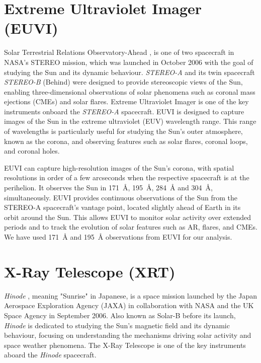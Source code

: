 \section{Extreme Ultraviolet Imager (EUVI)}

Solar Terrestrial Relations Observatory-Ahead \citep[{\it STEREO-A};][]{stereo}, is one of two spacecraft in NASA's STEREO mission, which was launched in October 2006 with the goal of studying the Sun and its dynamic behaviour. {\it STEREO-A} and its twin spacecraft {\it STEREO-B} (Behind) were designed to provide stereoscopic views of the Sun, enabling three-dimensional observations of solar phenomena such as coronal mass ejections (CMEs) and solar flares. Extreme Ultraviolet Imager \citep[EUVI;][]{euvi} is one of the key instruments onboard the {\it STEREO-A} spacecraft. EUVI is designed to capture images of the Sun in the extreme ultraviolet (EUV) wavelength range. This range of wavelengths is particularly useful for studying the Sun's outer atmosphere, known as the corona, and observing features such as solar flares, coronal loops, and coronal holes. 

EUVI can capture high-resolution images of the Sun's corona, with spatial resolutions in order of a few arcseconds when the respective spacecraft is at the perihelion. It observes the Sun in 171~{\AA}, 195~{\AA}, 284~{\AA} and 304~{\AA}, simultaneously. EUVI provides continuous observations of the Sun from the STEREO-A spacecraft's vantage point, located slightly ahead of Earth in its orbit around the Sun. This allows EUVI to monitor solar activity over extended periods and to track the evolution of solar features such as AR, flares, and CMEs. We have used 171~{\AA} and 195~{\AA} observations from EUVI for our analysis.

\section{X-Ray Telescope (XRT)}

{\it Hinode} \citep{hinode}, meaning "Sunrise" in Japanese, is a space mission launched by the Japan Aerospace Exploration Agency (JAXA) in collaboration with NASA and the UK Space Agency in September 2006. Also known as Solar-B before its launch, {\it Hinode} is dedicated to studying the Sun's magnetic field and its dynamic behaviour, focusing on understanding the mechanisms driving solar activity and space weather phenomena. The X-Ray Telescope \citep[XRT;][]{xrt} is one of the key instruments aboard the {\it Hinode} spacecraft.

